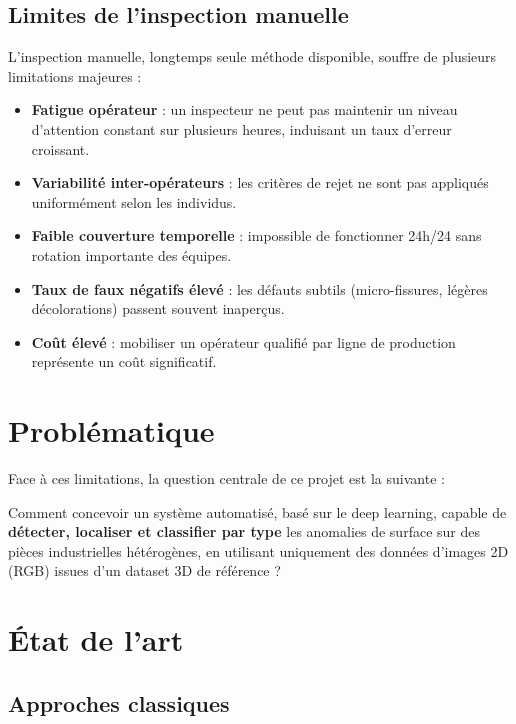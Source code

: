 \documentclass[12pt, a4paper]{report}
\begin{document}
\subsection{Limites de l'inspection manuelle}

L'inspection manuelle, longtemps seule méthode disponible, souffre de plusieurs limitations majeures :

\begin{itemize}
  \item \textbf{Fatigue opérateur} : un inspecteur ne peut pas maintenir un niveau d'attention constant sur plusieurs heures, induisant un taux d'erreur croissant.
  \item \textbf{Variabilité inter-opérateurs} : les critères de rejet ne sont pas appliqués uniformément selon les individus.
  \item \textbf{Faible couverture temporelle} : impossible de fonctionner 24h/24 sans rotation importante des équipes.
  \item \textbf{Taux de faux négatifs élevé} : les défauts subtils (micro-fissures, légères décolorations) passent souvent inaperçus.
  \item \textbf{Coût élevé} : mobiliser un opérateur qualifié par ligne de production représente un coût significatif.
\end{itemize}

\section{Problématique}

Face à ces limitations, la question centrale de ce projet est la suivante :

\begin{infobox}[Problématique]
Comment concevoir un système automatisé, basé sur le deep learning, capable de \textbf{détecter, localiser et classifier par type} les anomalies de surface sur des pièces industrielles hétérogènes, en utilisant uniquement des données d'images 2D (RGB) issues d'un dataset 3D de référence ?
\end{infobox}

\section{État de l'art}

\subsection{Approches classiques}
\end{document}
